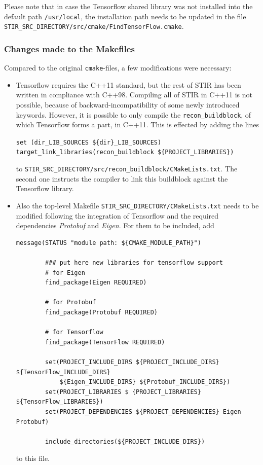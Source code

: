 \documentclass[a4paper, 11pt]{article}
\begin{document}
   Please note that in case the Tensorflow shared library was not installed into the default path \texttt{/usr/local}, the installation path needs to be updated in the file \texttt{STIR\_SRC\_DIRECTORY/src/cmake\-/FindTensorFlow.cmake}.

   \subsubsection{Changes made to the Makefiles}
   Compared to the original \texttt{cmake}-files, a few modifications were necessary:
   \begin{itemize}
   \item Tensorflow requires the C++11 standard, but the rest of STIR has been written in compliance with C++98. Compiling all of STIR in C++11 is not possible, because of backward-incompatibility of some newly introduced keywords. However, it is possible to only compile the \texttt{recon\_buildblock}, of which Tensorflow forms a part, in C++11. This is effected by adding the lines

      \texttt{set (dir\_LIB\_SOURCES \$\{dir\}\_LIB\_SOURCES)\\
      target\_link\_libraries(recon\_buildblock \$\{PROJECT\_LIBRARIES\})}

      to \texttt{STIR\_SRC\_DIRECTORY/src/recon\_buildblock/CMakeLists.txt}. The second one instructs the compiler to link this buildblock against the Tensorflow library.
    \item Also the top-level Makefile \texttt{STIR\_SRC\_DIRECTORY/CMakeLists.txt} needs to be modified following the integration of Tensorflow and the required dependencies \textsl{Protobuf} and \textsl{Eigen}. For them to be included, add
      
      \begin{lstlisting}[basicstyle=\small]
        message(STATUS "module path: ${CMAKE_MODULE_PATH}")
        
        ### put here new libraries for tensorflow support
        # for Eigen
        find_package(Eigen REQUIRED)
        
        # for Protobuf
        find_package(Protobuf REQUIRED)
        
        # for Tensorflow
        find_package(TensorFlow REQUIRED)
        
        set(PROJECT_INCLUDE_DIRS ${PROJECT_INCLUDE_DIRS} ${TensorFlow_INCLUDE_DIRS} 
            ${Eigen_INCLUDE_DIRS} ${Protobuf_INCLUDE_DIRS})
        set(PROJECT_LIBRARIES $ {PROJECT_LIBRARIES} ${TensorFlow_LIBRARIES})
        set(PROJECT_DEPENDENCIES ${PROJECT_DEPENDENCIES} Eigen Protobuf)
        
        include_directories(${PROJECT_INCLUDE_DIRS})
      \end{lstlisting}
      
      to this file.
  \end{itemize}
\end{document}

